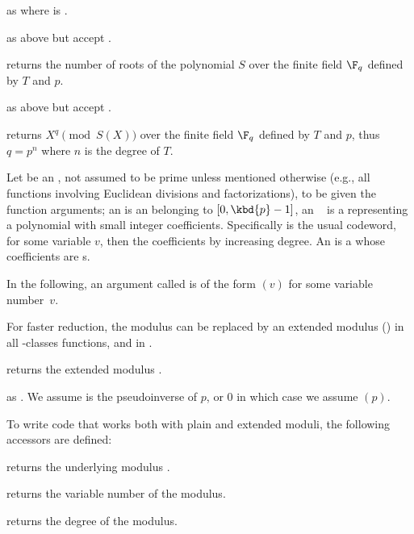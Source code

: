  as
 where  is .

 as above but accept .

 returns the number of roots of
the polynomial $S$ over the finite field $\F_q$ defined by $T$ and $p$.

 as above but accept .

 returns
$X^{q}\pmod{S(X)}$ over the finite field $\F_q$ defined by $T$ and $p$, thus
$q=p^n$ where $n$ is the degree of $T$.

 Let  be an , not assumed to be
prime unless mentioned otherwise (e.g., all functions involving Euclidean
divisions and factorizations), to be given the function arguments; an
 is an  belonging to $[0,\kbd{p}-1]$, an ~
is a  representing a polynomial with small integer
coefficients. Specifically  is the usual codeword,  for some variable $v$, then the coefficients by increasing
degree. An  is a  whose coefficients are s.

\noindent In the following, an argument called  is of the form
$(v)$ for some variable number~$v$.


For faster reduction, the modulus  can be replaced by an extended
modulus () in all -classes functions, and in
.

 returns the extended modulus .

 as .
We assume  is the pseudoinverse of $p$, or $0$ in which case we
assume $(p)$.

To write code that works both with plain and extended moduli, the following
accessors are defined:

 returns the underlying modulus .

 returns the variable number of the modulus.

 returns the degree of the modulus.

